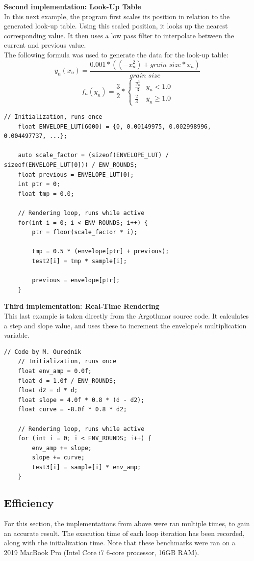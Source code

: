 \documentclass[10pt, twocolumn]{IEEEtran}
\begin{document}
\textbf{Second implementation: Look-Up Table}\\
In this next example, the program first scales its position in relation to the generated look-up table. Using this scaled position, it looks up the nearest corresponding value. It then uses a low pass filter to interpolate between the current and previous value.\\
The following formula was used to generate the data for the look-up table:
\[
y_n(x_n) = \frac{0.001*((-x_n^2)+\textit{grain size}*x_n)}{\textit{grain size}}
\]
\[	
f_n(y_n) = \frac{3}{2} * \begin{cases}
	\frac{y_n^3}{3}  	& y_n < 1.0 \\
	\frac{2}{3} 	& y_n \geq 1.0
\end{cases}
\]
\begin{lstlisting}[caption={Envelope application using a look-up table}]
	// Initialization, runs once
	float ENVELOPE_LUT[6000] = {0, 0.00149975, 0.002998996, 0.004497737, ...};
	
	auto scale_factor = (sizeof(ENVELOPE_LUT) / sizeof(ENVELOPE_LUT[0])) / ENV_ROUNDS;
	float previous = ENVELOPE_LUT[0];
	int ptr = 0;
	float tmp = 0.0;
	
	// Rendering loop, runs while active
	for(int i = 0; i < ENV_ROUNDS; i++) {
		ptr = floor(scale_factor * i);
		
		tmp = 0.5 * (envelope[ptr] + previous);
		test2[i] = tmp * sample[i];
		
		previous = envelope[ptr];
	}
\end{lstlisting}

\textbf{Third implementation: Real-Time Rendering}\\
This last example is taken directly from the Argotlunar source code. It calculates a step and slope value, and uses these to increment the envelope's multiplication variable.

\begin{lstlisting}[caption={Envelope application using real-time rendering}]
	// Code by M. Ourednik
	// Initialization, runs once
	float env_amp = 0.0f;
	float d = 1.0f / ENV_ROUNDS;
	float d2 = d * d;
	float slope = 4.0f * 0.8 * (d - d2);
	float curve = -8.0f * 0.8 * d2;
	
	// Rendering loop, runs while active
	for (int i = 0; i < ENV_ROUNDS; i++) {
		env_amp += slope;
		slope += curve;
		test3[i] = sample[i] * env_amp;
	}
\end{lstlisting}


\subsection{Efficiency}
For this section, the implementations from above were ran multiple times, to gain an accurate result. The execution time of each loop iteration has been recorded, along with the initialization time. Note that these benchmarks were ran on a 2019 MacBook Pro (Intel Core i7 6-core processor, 16GB RAM).
\end{document}
